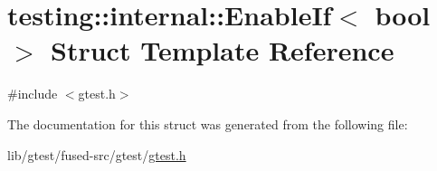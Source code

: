 \hypertarget{structtesting_1_1internal_1_1_enable_if}{\section{testing\-:\-:internal\-:\-:Enable\-If$<$ bool $>$ Struct Template Reference}
\label{structtesting_1_1internal_1_1_enable_if}
}


{\ttfamily \#include $<$gtest.\-h$>$}



The documentation for this struct was generated from the following file\-:\begin{DoxyCompactItemize}
\item 
lib/gtest/fused-\/src/gtest/\hyperlink{fused-src_2gtest_2gtest_8h}{gtest.\-h}\end{DoxyCompactItemize}
